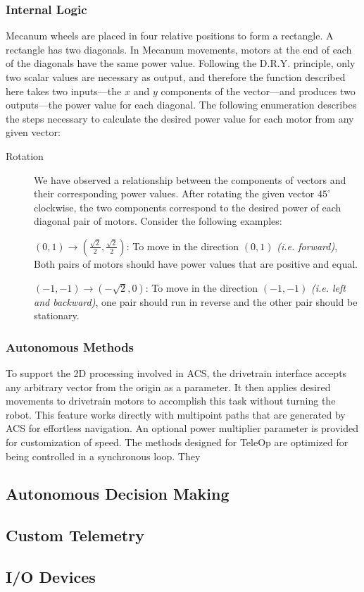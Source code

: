 \documentclass[letterpaper]{article}
\begin{document}
\subsubsection{Internal Logic}
Mecanum wheels are placed in four relative positions to form a rectangle. A rectangle has two diagonals. In Mecanum movements, motors at the end of each of the diagonals have the same power value. Following the D.R.Y. principle, only two scalar values are necessary as output, and therefore the function described here takes two inputs---the $x$ and $y$ components of the vector---and produces two outputs---the power value for each diagonal. The following enumeration describes the steps necessary to calculate the desired power value for each motor from any given vector:
\begin{description}
	\item[Rotation]
	We have observed a relationship between the components of vectors and their corresponding power values. After rotating the given vector $45^\circ$ clockwise, the two components correspond to the desired power of each diagonal pair of motors. Consider the following examples:
\begin{center}
	$(0, 1) \rightarrow (\frac{\sqrt{2}}{2}, \frac{\sqrt{2}}{2})$: To move in the direction $(0, 1)$ \textit{(i.e. forward)}, Both pairs of motors should have power values that are positive and equal.
	
	$(-1, -1) \rightarrow (-\sqrt{2},0)$: To move in the direction $(-1, -1)$ \textit{(i.e. left and backward)}, one pair should run in reverse and the other pair should be stationary.
\end{center}
	
\end{description}

\subsubsection{Autonomous Methods}
To support the 2D processing involved in ACS, the drivetrain interface accepts any arbitrary vector from the origin as a parameter. It then applies desired movements to drivetrain motors to accomplish this task without turning the robot. This feature works directly with multipoint paths that are generated by ACS for effortless navigation. An optional power multiplier parameter is provided for customization of speed. The methods designed for TeleOp are optimized for being controlled in a synchronous loop. They

\subsection{Autonomous Decision Making}

\subsection{Custom Telemetry}

\subsection{I/O Devices}
\end{document}
